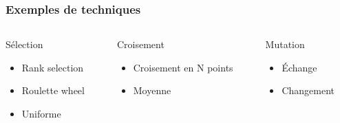 \begin{frame}
    \frametitle{Exemples de techniques}
    \begin{columns}
        \begin{column}{3cm}
            \begin{block}{Sélection}
                \begin{itemize}
                    \item Rank selection
                    \item Roulette wheel 
                    \item Uniforme
                \end{itemize}
            \end{block}
        \end{column}
        \pause
        \begin{column}{3cm}
            \begin{block}{Croisement}
                \begin{itemize}
                    \item Croisement en N points
                    \item Moyenne
                \end{itemize}
            \end{block}
        \end{column}
        \pause
        \begin{column}{3cm}
            \begin{block}{Mutation}
                \begin{itemize}
                    \item Échange
                    \item Changement 
                \end{itemize}
            \end{block}
        \end{column}
    \end{columns}
\end{frame}
